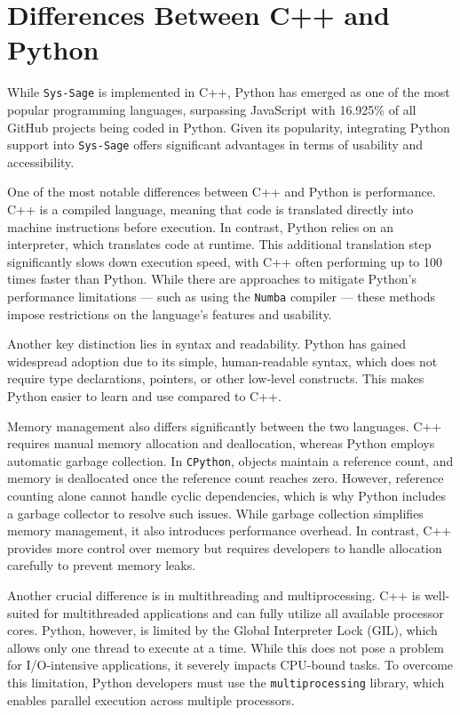 \section{Differences Between C++ and Python}

While \texttt{Sys-Sage} is implemented in C++, Python has emerged as one of the most popular programming languages, surpassing JavaScript with 16.925\% of all GitHub projects being coded in Python. Given its popularity, integrating Python support into \texttt{Sys-Sage} offers significant advantages in terms of usability and accessibility. \cite{languages-github-stats}

One of the most notable differences between C++ and Python is performance. C++ is a compiled language, meaning that code is translated directly into machine instructions before execution. In contrast, Python relies on an interpreter, which translates code at runtime. This additional translation step significantly slows down execution speed, with C++ often performing up to 100 times faster than Python. While there are approaches to mitigate Python's performance limitations — such as using the \texttt{Numba} compiler\parencite{numba} — these methods impose restrictions on the language’s features and usability.\cite{languages-performance}

Another key distinction lies in syntax and readability. Python has gained widespread adoption due to its simple, human-readable syntax, which does not require type declarations, pointers, or other low-level constructs. This makes Python easier to learn and use compared to C++.

Memory management also differs significantly between the two languages. C++ requires manual memory allocation and deallocation, whereas Python employs automatic garbage collection. In \texttt{CPython}, objects maintain a reference count, and memory is deallocated once the reference count reaches zero. However, reference counting alone cannot handle cyclic dependencies, which is why Python includes a garbage collector to resolve such issues. While garbage collection simplifies memory management, it also introduces performance overhead\parencite{python-gc}. In contrast, C++ provides more control over memory but requires developers to handle allocation carefully to prevent memory leaks.\cite{python-gc}

Another crucial difference is in multithreading and multiprocessing. C++ is well-suited for multithreaded applications and can fully utilize all available processor cores. Python, however, is limited by the Global Interpreter Lock (GIL), which allows only one thread to execute at a time. While this does not pose a problem for \ac{I/O}-intensive applications, it severely impacts CPU-bound tasks. To overcome this limitation, Python developers must use the \texttt{multiprocessing} library, which enables parallel execution across multiple processors.\parencite{python-threading}

\printbibliography
